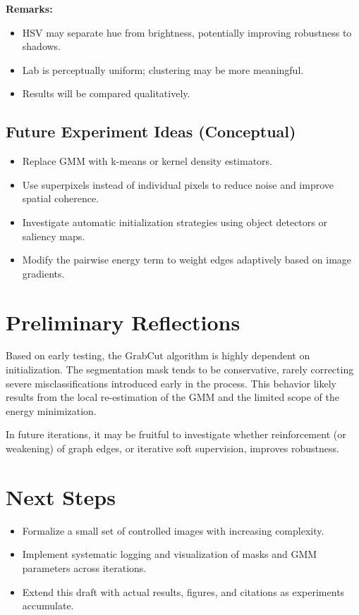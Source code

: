 \documentclass[11pt]{article}
\begin{document}
\textbf{Remarks:}
\begin{itemize}
    \item HSV may separate hue from brightness, potentially improving robustness to shadows.
    \item Lab is perceptually uniform; clustering may be more meaningful.
    \item Results will be compared qualitatively.
\end{itemize}

\subsection{Future Experiment Ideas (Conceptual)}

\begin{itemize}
    \item Replace GMM with k-means or kernel density estimators.
    \item Use superpixels instead of individual pixels to reduce noise and improve spatial coherence.
    \item Investigate automatic initialization strategies using object detectors or saliency maps.
    \item Modify the pairwise energy term to weight edges adaptively based on image gradients.
\end{itemize}

\section{Preliminary Reflections}

Based on early testing, the GrabCut algorithm is highly dependent on initialization. The segmentation mask tends to be conservative, rarely correcting severe misclassifications introduced early in the process. This behavior likely results from the local re-estimation of the GMM and the limited scope of the energy minimization.

In future iterations, it may be fruitful to investigate whether reinforcement (or weakening) of graph edges, or iterative soft supervision, improves robustness.

\section{Next Steps}

\begin{itemize}
    \item Formalize a small set of controlled images with increasing complexity.
    \item Implement systematic logging and visualization of masks and GMM parameters across iterations.
    \item Extend this draft with actual results, figures, and citations as experiments accumulate.
\end{itemize}
\end{document}
